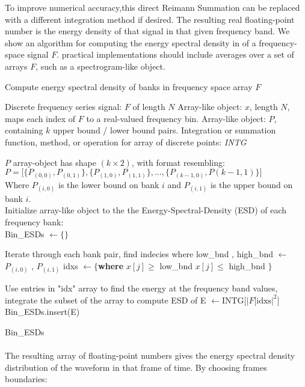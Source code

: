 \documentclass[12pt,letterpaper]{article}
\begin{document}
To improve numerical accuracy,this direct Reimann Summation can be replaced with a different integration method if desired. The resulting real floating-point number is the energy density of that signal in that given frequency band. We show an algorithm for computing the energy spectral density in of a frequency-space signal $F$. practical implementations should include averages over a set of arrays $F$, such as a spectrogram-like object.

\begin{algorithm}
\label{ESD}
\caption{Compute energy spectral density of banks in frequency space array $F$}
\begin{algorithmic}
\REQUIRE Discrete frequency series signal: $F$ of length $N$
\REQUIRE Array-like object: $x$, length $N$, maps each index of $F$ to a real-valued frequency bin.
\REQUIRE Array-like object: $P$, containing $k$ upper bound / lower bound pairs.
\REQUIRE Integration or summation function, method, or operation for array of discrete points: \textit{INTG}

\ENSURE $P$ array-object has shape $(k \times 2)$, with format resembling: \\
$P = \Big[ \{P_{(0,0)},P_{(0,1)}\} , \{P_{(1,0)},P_{(1 ,1)}\} ,  ... , \{P_{(k-1,0)},P{(k-1,1)}\} \Big]$\\
Where $P_{(i,0)}$ is the lower bound on bank $i$ and $P_{(i,1)}$ is the upper bound on bank $i$.\\
Initialize array-like object to the the Energy-Spectral-Density (ESD) of each frequency bank: \\
Bin\_ESDs $\leftarrow \{\}$

	\item Iterate through each bank pair, find indecies where  
	\STATE low\_bnd , high\_bnd $\leftarrow$ $P_{(i,0)}$ , $P_{(i,1)}$
	\STATE idxs $\leftarrow \{ $\textbf{where} $x[j] \geq$ low\_bnd \AND $x[j] \leq$ high\_bnd $\}$
	\item Use entries in "idx" array to find the energy at the frequency band values, integrate the subset of the array to compute ESD of 
	\STATE E $\leftarrow \text{INTG}\big[ |F[\text{idxs}|^2 \Big]$
	\STATE Bin\_ESDs.insert(E)
\ENDFOR

\RETURN Bin\_ESDs
\end{algorithmic}
\end{algorithm}

\paragraph*{}The resulting array of floating-point numbers gives the energy spectral density distribution of the waveform in that frame of time. By choosing frames boundaries:
\end{document}
